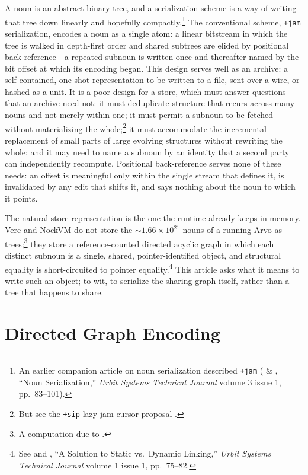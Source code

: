 \documentclass[twoside]{article}
\begin{document}
A noun is an abstract binary tree, and a serialization scheme is a way of writing that tree down linearly and hopefully compactly.\footnote{An earlier companion article on noun serialization described \texttt{+jam} ( \& , ``Noun Serialization,'' \emph{Urbit Systems Technical Journal} volume 3 issue 1, pp.~83--101).}  The conventional scheme, \texttt{+jam} serialization, encodes a noun as a single atom:  a linear bitstream in which the tree is walked in depth-first order and shared subtrees are elided by positional back-reference---a repeated subnoun is written once and thereafter named by the bit offset at which its encoding began.  This design serves well as an archive:  a self-contained, one-shot representation to be written to a file, sent over a wire, or hashed as a unit.  It is a poor design for a store, which must answer questions that an archive need not:  it must deduplicate structure that recurs across many nouns and not merely within one; it must permit a subnoun to be fetched without materializing the whole;\footnote{But see the \texttt{+sip} lazy jam cursor proposal .} it must accommodate the incremental replacement of small parts of large evolving structures without rewriting the whole; and it may need to name a subnoun by an identity that a second party can independently recompute.  Positional back-reference serves none of these needs:  an offset is meaningful only within the single stream that defines it, is invalidated by any edit that shifts it, and says nothing about the noun to which it points.

The natural store representation is the one the runtime already keeps in memory.  Vere and NockVM do not store the $\sim\!\!1.66 \times 10^{21}$ nouns of a running Arvo as trees;\footnote{A computation due to .} they store a reference-counted directed acyclic graph in which each distinct subnoun is a single, shared, pointer-identified object, and structural equality is short-circuited to pointer equality.\footnote{See  and , ``A Solution to Static vs.\ Dynamic Linking,'' \emph{Urbit Systems Technical Journal} volume 1 issue 1, pp.~75--82.}\nocite{rovnys2024a}  This article asks what it means to write such an object; to wit, to serialize the sharing graph itself, rather than a tree that happens to share.

\section{Directed Graph Encoding}
\label{sec:dag}
\end{document}
